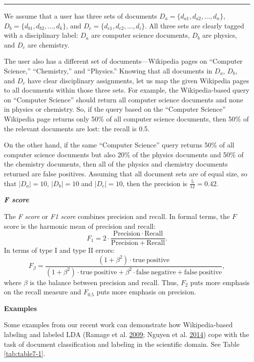 \documentclass[]{krantz}
\begin{document}
\begin{center}\rule{0.5\linewidth}{\linethickness}\end{center}

We assume that a user has three sets of documents
\(D_a =\{d_{a1},d_{a2},\ldots, d_n\}\),
\(D_b=\{d_{b1}, d_{b2}, \ldots, d_k\}\), and
\(D_c =\{d_{c1},d_{c2},\ldots,d_i\}\). All three sets are clearly tagged
with a disciplinary label: \(D_a\) are computer science documents,
\(D_b\) are physics, and \(D_c\) are chemistry.

The user also has a different set of documents---Wikipedia pages on
``Computer Science,'' ``Chemistry,'' and ``Physics.'' Knowing that all
documents in \(D_a\), \(D_b\), and \(D_c\) have clear disciplinary
assignments, let us map the given Wikipedia pages to all documents
within those three sets. For example, the Wikipedia-based query on
``Computer Science'' should return all computer science documents and
none in physics or chemistry. So, if the query based on the ``Computer
Science'' Wikipedia page returns only 50\% of all computer science
documents, then 50\% of the relevant documents are lost: the recall is
0.5.

On the other hand, if the same ``Computer Science'' query returns 50\%
of all computer science documents but also 20\% of the physics documents
and 50\% of the chemistry documents, then all of the physics and
chemistry documents returned are false positives. Assuming that all
document sets are of equal size, so that \(|D_a| = 10\), \(|D_b|=10\)
and \(|D_c| = 10\), then the precision is \(\frac{5}{12} = 0.42\).

\textbf{\emph{F score}}

The \emph{F score} or \emph{F1 score} combines precision and recall. In
formal terms, the \(F\) score is the harmonic mean of precision and
recall: \[\label{eq:text:F1}
F_1 = 2\cdot \frac{\mathrm{Precision}\cdot \mathrm{Recall}}{\mathrm{Precision}+\mathrm{Recall}}.\]
In terms of type I and type II errors:
\[F_\beta = \frac{(1+\beta^2)\cdot \mathrm{true\ positive}}{(1+\beta^2)\cdot \mathrm{true\ positive} + \beta^2\cdot \mathrm{false\ negative} + \mathrm{false\ positive}},\]
where \(\beta\) is the balance between precision and recall. Thus,
\(F_2\) puts more emphasis on the recall measure and \(F_{0.5}\) puts
more emphasis on precision.

\textbf{Examples}

Some examples from our recent work can demonstrate how Wikipedia-based
labeling and labeled LDA (Ramage et al.
\protect\hyperlink{ref-ramage-09}{2009}; Nguyen et al.
\protect\hyperlink{ref-Nguyen:Boyd-Graber:Resnik:Chang-2014}{2014}) cope
with the task of document classification and labeling in the scientific
domain. See Table \ref{tab:table7-1}.
\end{document}
